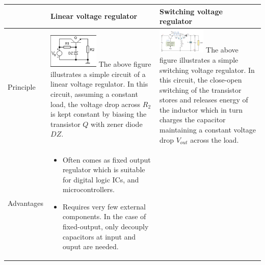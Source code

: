 \documentclass[main.tex]{subfiles}
\begin{document}
    \begin{table}[!h]
        \centering
        \begin{tabular}{|m{0.1\linewidth}|m{0.45\linewidth}|m{0.45\linewidth}|}
        
        \hline
        & Linear voltage regulator & Switching voltage regulator \\
        \hline
        Principle & 

        \includegraphics[width=0.45\textwidth]{media/series_regulator.png}
        The above figure illustrates a simple circuit of a linear voltage regulator. In this circuit, assuming a constant load, the voltage drop across $R_2$ is kept constant by biasing the transistor $Q$ with zener diode $DZ$. &

        \includegraphics[width=0.45\textwidth]{media/inverting_switch_regulator.png}
        The above figure illustrates a simple switching voltage regulator. In this circuit, the close-open switching of the transistor stores and releases energy of the inductor which in turn charges the capacitor maintaining a constant voltage drop $V_{out}$ across the load. \\

        \hline
        Advantages & 

        \begin{itemize}
            \item Often comes as fixed output regulator which is suitable for digital logic ICs, and microcontrollers.
            \item Requires very few external components. In the case of fixed-output, only decouply capacitors at input and ouput are needed.
        \end{itemize} &
        

\end{tabular}
\end{table}
\end{document}
